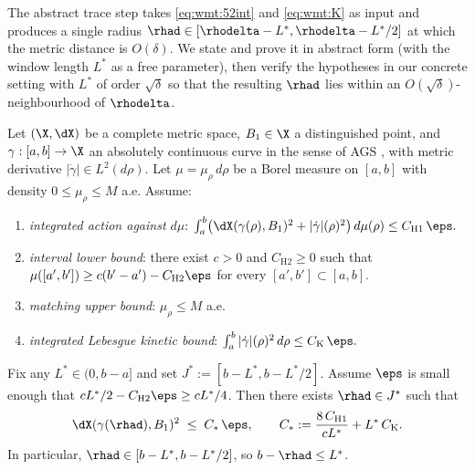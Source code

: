 The abstract trace step takes \eqref{eq:wmt:52int} and \eqref{eq:wmt:K}
as input and produces a single radius
$\rhad\in[\rhodelta-L^*,\rhodelta-L^*/2]$ at which the metric distance
is $O(\delta)$. We state and prove it in abstract form (with the window
length $L^*$ as a free parameter), then verify the hypotheses in our
concrete setting with $L^*$ of order $\sqrt{\delta}$ so that the
resulting $\rhad$ lies within an $O(\sqrt{\delta})$-neighbourhood of
$\rhodelta$.

\begin{theorem}
\label{thm:wmt:abstract-trace}
Let $(\X,\dX)$ be a complete metric space, $B_1\in\X$ a distinguished
point, and $\gamma:[a,b]\to\X$ an absolutely continuous curve in the
sense of AGS \cite[Thm.~1.1.2]{AGS2008}, with metric derivative
$|\dot\gamma|\in L^2(d\rho)$. Let $\mu=\mu_\rho\,d\rho$ be a Borel
measure on $[a,b]$ with density $0\le\mu_\rho\le M$ a.e. Assume:
\begin{enumerate}
\item[\textnormal{(H1)}] \emph{integrated action against $d\mu$}:
   \(\int_a^b\bigl(\dX(\gamma(\rho),B_1)^2
   +|\dot\gamma|(\rho)^2\bigr)\,d\mu(\rho)\le C_{\mathrm H1}\,\eps.\)
\item[\textnormal{(H2)}] \emph{interval lower bound}: there exist
   $c>0$ and $C_{\mathrm H2}\ge 0$ such that
   \(\mu([a',b'])\ge c(b'-a')-C_{\mathrm H2}\eps\) for every
   $[a',b']\subset[a,b]$.
\item[\textnormal{(H3)}] \emph{matching upper bound}: $\mu_\rho\le M$
   a.e.
\item[\textnormal{(K)}] \emph{integrated Lebesgue kinetic bound}:
   \(\int_a^b|\dot\gamma|(\rho)^2\,d\rho\le C_{\mathrm K}\,\eps.\)
\end{enumerate}
Fix any $L^*\in(0,b-a]$ and set $J^*:=[b-L^*,b-L^*/2]$. Assume $\eps$
is small enough that $cL^*/2-C_{\mathrm H2}\eps\ge cL^*/4$. Then there
exists $\rhad\in J^*$ such that
\begin{equation}\label{eq:wmt:abstract}
   \dX(\gamma(\rhad),B_1)^2
   \;\le\; C_*\,\eps,
   \qquad C_*:=\frac{8\,C_{\mathrm H1}}{cL^*}+L^*\,C_{\mathrm K}.
\end{equation}
In particular, $\rhad\in[b-L^*,b-L^*/2]$, so $b-\rhad\le L^*$.
\end{theorem}


